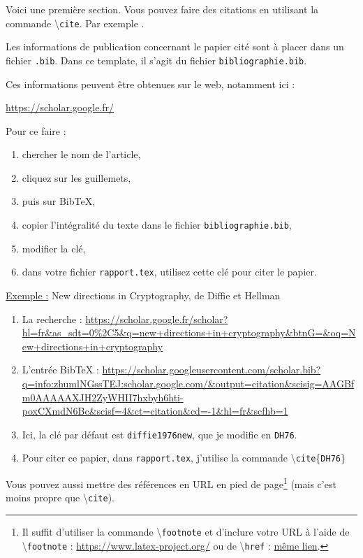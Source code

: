 \documentclass[a4paper, 12pt]{article}
\begin{document}
Voici une première section. Vous pouvez faire des citations en utilisant la commande \textbackslash\texttt{cite}. Par exemple \cite{DH76}.

Les informations de publication concernant le papier cité sont à placer dans un fichier \texttt{.bib}. Dans ce template, il s'agit du fichier \texttt{bibliographie.bib}.

Ces informations peuvent être obtenues sur le web, notamment ici : 
\begin{center}
\url{https://scholar.google.fr/}
\end{center}


Pour ce faire :
\begin{enumerate}
\item chercher le nom de l'article,
\item cliquez sur les guillemets,
\item puis sur BibTeX,
\item copier l'intégralité du texte dans le fichier \texttt{bibliographie.bib},
\item modifier la clé,
\item dans votre fichier \texttt{rapport.tex}, utilisez cette clé pour citer le papier.
\end{enumerate} 

\underline{Exemple :} New directions in Cryptography, de Diffie et Hellman

\begin{enumerate}
\item La recherche : \url{https://scholar.google.fr/scholar?hl=fr&as_sdt=0%2C5&q=new+directions+in+cryptography&btnG=&oq=New+directions+in+cryptography}
\item L'entrée BibTeX : \url{https://scholar.googleusercontent.com/scholar.bib?q=info:zhumlNGssTEJ:scholar.google.com/&output=citation&scisig=AAGBfm0AAAAAXJH2ZyWHII7hxbyh6hti-poxCXmdN6Bc&scisf=4&ct=citation&cd=-1&hl=fr&scfhb=1}
\item Ici, la clé par défaut est \texttt{diffie1976new}, que je modifie en \texttt{DH76}. 
\item Pour citer ce papier, dans \texttt{rapport.tex}, j'utilise la commande \textbackslash\texttt{cite}\{\texttt{DH76}\}
\end{enumerate}



Vous pouvez aussi mettre des références en URL en pied de page\footnote{Il suffit d'utiliser la commande \textbackslash\texttt{footnote} et d'inclure votre URL à l'aide de \textbackslash\texttt{footnote} : \url{https://www.latex-project.org/} ou de \textbackslash\texttt{href} : \href{https://www.latex-project.org/}{même lien}.} (mais c'est moins propre que \textbackslash\texttt{cite}).
 
\end{document}

